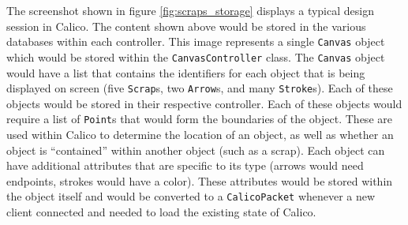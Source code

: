 The screenshot shown in figure \ref{fig:scraps_storage} displays a typical design session in Calico. The content shown above would be stored in the various databases within each controller. This image represents a single \texttt{Canvas} object which would be stored within the \texttt{CanvasController} class. The \texttt{Canvas} object would have a list that contains the identifiers for each object that is being displayed on screen (five \texttt{Scrap}s, two \texttt{Arrow}s, and many \texttt{Stroke}s). Each of these objects would be stored in their respective controller. Each of these objects would require a list of \texttt{Point}s that would form the boundaries of the object. These are used within Calico to determine the location of an object, as well as whether an object is ``contained'' within another object (such as a scrap). Each object can have additional attributes that are specific to its type (arrows would need endpoints, strokes would have a color). These attributes would be stored within the object itself and would be converted to a \texttt{CalicoPacket} whenever a new client connected and needed to load the existing state of Calico.



